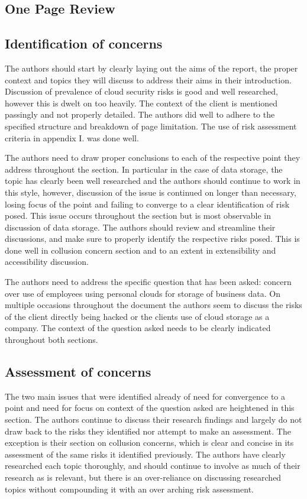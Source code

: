 \documentclass[12pt, oneside]{article}
\begin{document}
\subsection*{One Page Review}
\subsection*{Identification of concerns}
The authors should start by clearly laying out the aims of the report, the proper context and topics they will discuss to address their aims in their introduction. Discussion of prevalence of cloud security risks is good and well researched, however this is dwelt on too heavily. The context of the client is mentioned passingly and not properly detailed. The authors did well to adhere to the specified structure and breakdown of page limitation. The use of risk assessment criteria in appendix I. was done well.

The authors need to draw proper conclusions to each of the respective point they address throughout the section. In particular in the case of data storage, the topic has clearly been well researched and the authors should continue to work in this style, however, discussion of the issue is continued on longer than necessary, losing focus of the point and failing to converge to a clear identification of risk posed. This issue occurs throughout the section but is most observable in discussion of data storage. The authors should review and streamline their discussions, and make sure to properly identify the respective risks posed. This is done well in collusion concern section and to an extent in extensibility and accessibility discussion.

The authors need to address the specific question that has been asked: concern over use of employees using personal clouds for storage of business data. On multiple occasions throughout the document the authors seem to discuss the risks of the client directly being hacked or the clients use of cloud storage as a company. The context of the question asked needs to be clearly indicated throughout both sections.
\subsection*{Assessment of concerns}
The two main issues that were identified already of need for convergence to a point and need for focus on context of the question asked are heightened in this section. The authors continue to discuss their research findings and largely do not draw back to the risks they identified nor attempt to make an assessment. The exception is their section on collusion concerns, which is clear and concise in its assessment of the same risks it identified previously. The authors have clearly researched each topic thoroughly, and should continue to involve as much of their research as is relevant, but there is an over-reliance on discussing researched topics without compounding it with an over arching risk assessment. 
\end{document}
